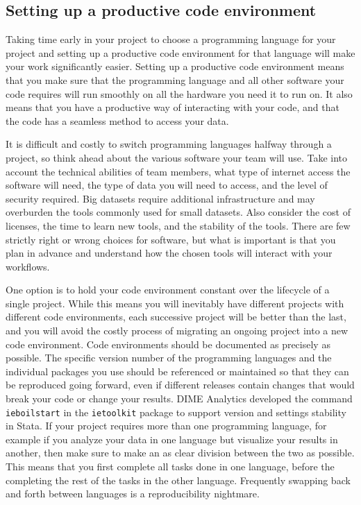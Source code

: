 \subsection{Setting up a productive code environment}

Taking time early in your project to choose a programming language for your project and
setting up a productive code environment for that language
will make your work significantly easier.
Setting up a productive code environment means that
you make sure that the programming language and all other software your code requires
will run smoothly on all the hardware you need it to run on.
It also means that you have a productive way of interacting with your code,
and that the code has a seamless method to access your data.

It is difficult and costly to switch programming languages halfway through a project,
so think ahead about the various software your team will use.
Take into account the technical abilities of team members,
what type of internet access the software will need,
the type of data you will need to access,
and the level of security required.
Big datasets require additional infrastructure and may overburden
the tools commonly used for small datasets.
Also consider the cost of licenses, the time to learn new tools,
and the stability of the tools.
There are few strictly right or wrong choices for software,
but what is important is that you plan in advance
and understand how the chosen tools will interact with your workflows.

One option is to hold your code environment constant
over the lifecycle of a single project.
While this means you will inevitably have different projects
with different code environments, each successive project will be better than the last,
and you will avoid the costly process of migrating an ongoing project
into a new code environment.
Code environments should be documented as precisely as possible.
The specific version number of the programming languages and the individual packages you use
should be referenced or maintained so that they can be reproduced going forward,
even if different releases contain changes that would break your code
or change your results.
DIME Analytics developed the command \texttt{ieboilstart} in the \texttt{ietoolkit} package
to support version and settings stability in Stata.
If your project requires more than one programming language,
for example if you analyze your data in one language but visualize your results in another,
then make sure to make an as clear division between the two as possible.
This means that you first complete all tasks done in one language,
before the completing the rest of the tasks in the other language.
Frequently swapping back and forth between languages is a reproducibility nightmare.

